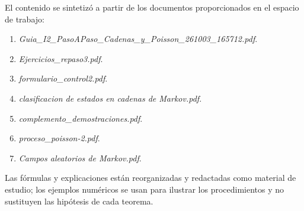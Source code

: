 \documentclass[11pt,oneside]{article}
\newcommand{\1}{\mathbf{1}}
\begin{document}
El contenido se sintetizó a partir de los documentos proporcionados en el espacio de trabajo:
\begin{enumerate}
  \item \textit{Guia\_I2\_PasoAPaso\_Cadenas\_y\_Poisson\_261003\_165712.pdf}.
  \item \textit{Ejercicios\_repaso3.pdf}.
  \item \textit{formulario\_control2.pdf}.
  \item \textit{clasificacion de estados en cadenas de Markov.pdf}.
  \item \textit{complemento\_demostraciones.pdf}.
  \item \textit{proceso\_poisson-2.pdf}.
  \item \textit{Campos aleatorios de Markov.pdf}.
\end{enumerate}
Las fórmulas y explicaciones están reorganizadas y redactadas como material de estudio; los ejemplos numéricos se usan para ilustrar los procedimientos y no sustituyen las hipótesis de cada teorema.
\end{document}
